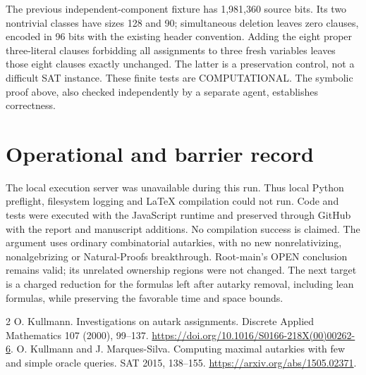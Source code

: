 \documentclass[11pt]{article}
\begin{document}
The previous independent-component fixture has 1,981,360 source bits.
Its two nontrivial classes have sizes 128 and 90; simultaneous deletion
leaves zero clauses, encoded in 96 bits with the existing header convention.
Adding the eight proper three-literal clauses forbidding all assignments
to three fresh variables leaves those eight clauses exactly unchanged.
The latter is a preservation control, not a difficult SAT instance.
These finite tests are COMPUTATIONAL. The symbolic proof above, also
checked independently by a separate agent, establishes correctness.

\section{Operational and barrier record}
The local execution server was unavailable during this run. Thus local
Python preflight, filesystem logging and LaTeX compilation could not run.
Code and tests were executed with the JavaScript runtime and preserved
through GitHub with the report and manuscript additions. No compilation
success is claimed.
The argument uses ordinary combinatorial autarkies, with no new
nonrelativizing, nonalgebrizing or Natural-Proofs breakthrough.
Root-main's OPEN conclusion remains valid; its unrelated ownership
regions were not changed.
The next target is a charged reduction for the formulas left after
autarky removal, including lean formulas, while preserving the favorable
time and space bounds.
\begin{thebibliography}{2}
 O. Kullmann. Investigations on autark assignments.
Discrete Applied Mathematics 107 (2000), 99--137.
\url{https://doi.org/10.1016/S0166-218X(00)00262-6}.
 O. Kullmann and J. Marques-Silva.
Computing maximal autarkies with few and simple oracle queries.
SAT 2015, 138--155.
\url{https://arxiv.org/abs/1505.02371}.
\end{thebibliography}
\end{document}
